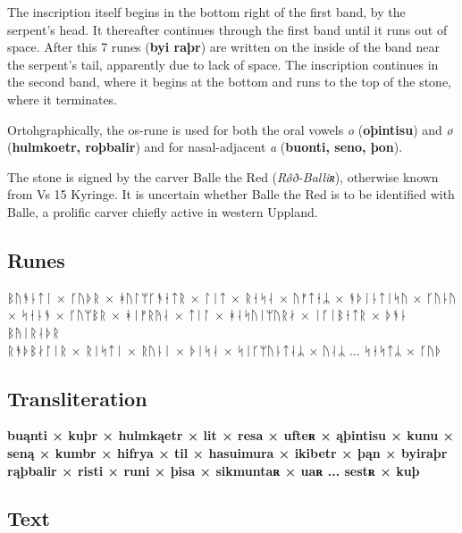 The inscription itself begins in the bottom right of the first band, by the serpent’s head.  It thereafter continues through the first band until it runs out of space.  After this 7 runes (\textbf{byi raþr}) are written on the inside of the band near the serpent’s tail, apparently due to lack of space.  The inscription continues in the second band, where it begins at the bottom and runs to the top of the stone, where it terminates.

Ortohgraphically, the os-rune is used for both the oral vowels \emph{o} (\textbf{oþintisu}) and \emph{ø} (\textbf{hulmkoetr, roþbalir}) and for nasal-adjacent \emph{a} (\textbf{buonti, seno, þon}).

The stone is signed by the carver Balle the Red (\emph{Rø̂ð-Balliʀ}), otherwise known from Vs 15 Kyringe.  It is uncertain whether Balle the Red is to be identified with Balle, a prolific carver chiefly active in western Uppland.

\subsection{Runes}

ᛒᚢᚬᚿᛏᛁ × ᚴᚢᚦᚱ × ᚼᚢᛚᛘᚴᚬᛂᛏᚱ × ᛚᛁᛏ × ᚱᛂᛋᛆ × ᚢᚠᛏᛂᛦ × ᚬᚦᛁᚿᛏᛁᛋᚢ × ᚴᚢᚿᚢ × ᛋᛂᚿᚬ × ᚴᚢᛘᛒᚱ × ᚼᛁᚠᚱᚤᛆ × ᛏᛁᛚ × ᚼᛆᛋᚢᛁᛘᚢᚱᛅ × ᛁᚴᛁᛒᛂᛏᚱ × ᚦᚬᚿ ᛒᚤᛁᚱᛆᚦᚱ \\
ᚱᚬᚦᛒᛅᛚᛁᚱ × ᚱᛁᛋᛏᛁ × ᚱᚢᚿᛁ × ᚦᛁᛋᛆ × ᛋᛁᚴᛘᚢᚿᛏᛆᛦ × ᚢᛆᛦ ... ᛋᛂᛋᛏᛦ × ᚴᚢᚦ


\subsection{Transliteration}

\textbf{buąnti × kuþr × hulmkąetr × lit × resa × ufteʀ × ąþintisu × kunu × seną × kumbr × hifrya × til × hasuimura × ikibetr × þąn × byiraþr} \\
\textbf{rąþbalir × risti × runi × þisa × sikmuntaʀ × uaʀ ... sestʀ × kuþ}

\subsection{Text}

